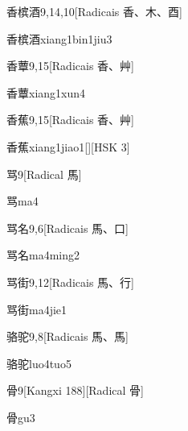 \begin{entry}{香槟酒}{9,14,10}[Radicais ⾹、⽊、⾣]
  \begin{phonetics}{香槟酒}{xiang1bin1jiu3}
  \end{phonetics}
\end{entry}

\begin{entry}{香蕈}{9,15}[Radicais ⾹、⾋]
  \begin{phonetics}{香蕈}{xiang1xun4}
  \end{phonetics}
\end{entry}

\begin{entry}{香蕉}{9,15}[Radicais ⾹、⾋]
  \begin{phonetics}{香蕉}{xiang1jiao1}[][HSK 3]
  \end{phonetics}
\end{entry}

\begin{entry}{骂}{9}[Radical ⾺]
  \begin{phonetics}{骂}{ma4}
  \end{phonetics}
\end{entry}

\begin{entry}{骂名}{9,6}[Radicais ⾺、⼝]
  \begin{phonetics}{骂名}{ma4ming2}
  \end{phonetics}
\end{entry}

\begin{entry}{骂街}{9,12}[Radicais ⾺、⾏]
  \begin{phonetics}{骂街}{ma4jie1}
  \end{phonetics}
\end{entry}

\begin{entry}{骆驼}{9,8}[Radicais ⾺、⾺]
  \begin{phonetics}{骆驼}{luo4tuo5}
  \end{phonetics}
\end{entry}

\begin{entry}{骨}{9}[Kangxi 188][Radical ⾻]
  \begin{phonetics}{骨}{gu3}
  \end{phonetics}
\end{entry}

